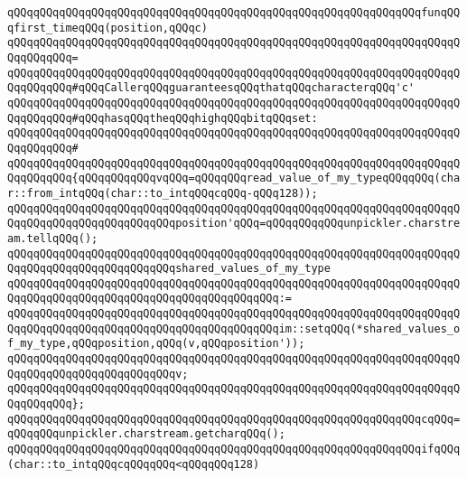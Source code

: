 \verb|qQQqqQQqqQQqqQQqqQQqqQQqqQQqqQQqqQQqqQQqqQQqqQQqqQQqqQQqqQQqqQQqfunqQQqfirst_timeqQQq(position,qQQqc)|\newline
\verb|qQQqqQQqqQQqqQQqqQQqqQQqqQQqqQQqqQQqqQQqqQQqqQQqqQQqqQQqqQQqqQQqqQQqqQQqqQQqqQQq=|\newline
\verb|qQQqqQQqqQQqqQQqqQQqqQQqqQQqqQQqqQQqqQQqqQQqqQQqqQQqqQQqqQQqqQQqqQQqqQQqqQQqqQQq#qQQqCallerqQQqguaranteesqQQqthatqQQqcharacterqQQq'c'|\newline
\verb|qQQqqQQqqQQqqQQqqQQqqQQqqQQqqQQqqQQqqQQqqQQqqQQqqQQqqQQqqQQqqQQqqQQqqQQqqQQqqQQq#qQQqhasqQQqtheqQQqhighqQQqbitqQQqset:|\newline
\verb|qQQqqQQqqQQqqQQqqQQqqQQqqQQqqQQqqQQqqQQqqQQqqQQqqQQqqQQqqQQqqQQqqQQqqQQqqQQqqQQq#|\newline
\verb|qQQqqQQqqQQqqQQqqQQqqQQqqQQqqQQqqQQqqQQqqQQqqQQqqQQqqQQqqQQqqQQqqQQqqQQqqQQqqQQq{qQQqqQQqqQQqvqQQq=qQQqqQQqread_value_of_my_typeqQQqqQQq(char::from_intqQQq(char::to_intqQQqcqQQq-qQQq128));|\newline
\newline
\verb|qQQqqQQqqQQqqQQqqQQqqQQqqQQqqQQqqQQqqQQqqQQqqQQqqQQqqQQqqQQqqQQqqQQqqQQqqQQqqQQqqQQqqQQqqQQqqQQqposition'qQQq=qQQqqQQqqQQqunpickler.charstream.tellqQQq();|\newline
\newline
\verb|qQQqqQQqqQQqqQQqqQQqqQQqqQQqqQQqqQQqqQQqqQQqqQQqqQQqqQQqqQQqqQQqqQQqqQQqqQQqqQQqqQQqqQQqqQQqqQQqshared_values_of_my_type|\newline
\verb|qQQqqQQqqQQqqQQqqQQqqQQqqQQqqQQqqQQqqQQqqQQqqQQqqQQqqQQqqQQqqQQqqQQqqQQqqQQqqQQqqQQqqQQqqQQqqQQqqQQqqQQqqQQqqQQq:=|\newline
\verb|qQQqqQQqqQQqqQQqqQQqqQQqqQQqqQQqqQQqqQQqqQQqqQQqqQQqqQQqqQQqqQQqqQQqqQQqqQQqqQQqqQQqqQQqqQQqqQQqqQQqqQQqqQQqqQQqim::setqQQq(*shared_values_of_my_type,qQQqposition,qQQq(v,qQQqposition'));|\newline
\newline
\verb|qQQqqQQqqQQqqQQqqQQqqQQqqQQqqQQqqQQqqQQqqQQqqQQqqQQqqQQqqQQqqQQqqQQqqQQqqQQqqQQqqQQqqQQqqQQqqQQqv;|\newline
\verb|qQQqqQQqqQQqqQQqqQQqqQQqqQQqqQQqqQQqqQQqqQQqqQQqqQQqqQQqqQQqqQQqqQQqqQQqqQQqqQQq};|\newline
\newline
\verb|qQQqqQQqqQQqqQQqqQQqqQQqqQQqqQQqqQQqqQQqqQQqqQQqqQQqqQQqqQQqqQQqcqQQq=qQQqqQQqunpickler.charstream.getcharqQQq();|\newline
\newline
\verb|qQQqqQQqqQQqqQQqqQQqqQQqqQQqqQQqqQQqqQQqqQQqqQQqqQQqqQQqqQQqqQQqifqQQq(char::to_intqQQqcqQQqqQQq<qQQqqQQq128)|\newline
